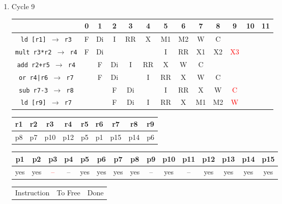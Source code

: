 \documentclass[12pt]{article}
\begin{document}
\begin{enumerate}
\begin{table}[H]
			\end{table}
		\item
			Cycle 9
			\begin{table}[H]
				\begin{tabular}{|c|c|c|c|c|c|c|c|c|c|c|c|c|}
					\hline
					 & 0 & 1 & 2 & 3 & 4 & 5 & 6 & 7 & 8 & 9 & 10 & 11\\
					\hline
					\texttt{ld [r1] $\rightarrow$ r3} & F & Di & I & RR & X & M1 & M2 & W & C &  &  &\\
					\hline
					\texttt{mult r3*r2 $\rightarrow$ r4} & F & Di &  &  &  & I & RR & X1 & X2 & \textcolor{red}{X3} &  &\\
					\hline
					\texttt{add r2+r5 $\rightarrow$ r4} &  & F & Di & I & RR & X & W & C &  &  &  &\\
					\hline
					\texttt{or r4|r6 $\rightarrow$ r7} &  & F & Di &  & I & RR & X & W & C &  &  &\\
					\hline
					\texttt{sub r7-3 $\rightarrow$ r8} &  &  & F & Di &  & I & RR & X & W & \textcolor{red}{C} &  &\\
					\hline
					\texttt{ld [r9] $\rightarrow$ r7} &  &  & F & Di & I & RR & X & M1 & M2 & \textcolor{red}{W} &  &\\
					\hline 
				\end{tabular}
			\end{table}
			\begin{table}[H]
				\begin{tabular}{|c|c|c|c|c|c|c|c|c|}
					\hline
					r1 & r2 & r3 & r4 & r5 & r6 & r7 & r8 & r9\\
					\hline
					p8 & p7 & p10 & p12 & p5 & p1 & p15 & p14 & p6\\
					\hline
				\end{tabular}
			\end{table}
			\begin{table}[H]
				\begin{tabular}{|c|c|c|c|c|c|c|c|c|c|c|c|c|c|c|}
					\hline
					p1 & p2 & p3 & p4 & p5 & p6 & p7 & p8 & p9 & p10 & p11 & p12 & p13 & p14 & p15\\
					\hline
					yes & yes & \textcolor{red}{--} & -- & yes & yes & yes & yes & -- & yes & -- & yes & yes & yes & yes\\
					\hline
				\end{tabular}
			\end{table}
			\begin{table}[H]
				\begin{tabular}{|c|c|c|}
					\hline
					Instruction & To Free & Done\\

\end{tabular}
\end{table}
\end{enumerate}
\end{document}
